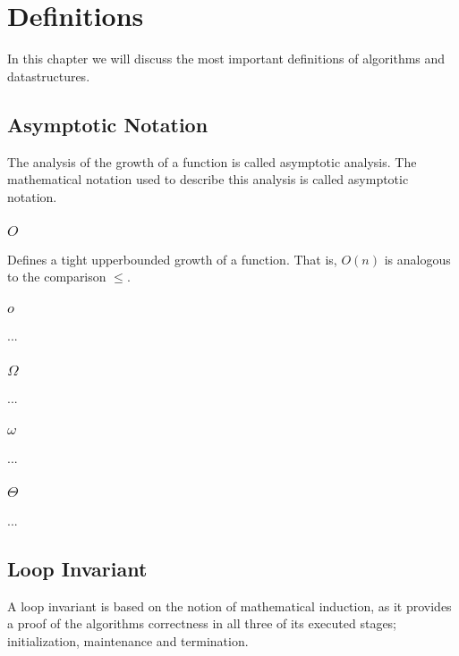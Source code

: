 
\thispagestyle{fancyplain}

\chapter{Definitions}
\label{ch:definitions}
In this chapter we will discuss the most important definitions of algorithms
and datastructures.

\section{Asymptotic Notation}
\label{ch:definitions|sec:asymptotic-notation}
The analysis of the growth of a function is called asymptotic analysis. The
mathematical notation used to describe this analysis is called asymptotic
notation.

\subsection{$O$}
\label{ch:definitions|sec:asymptotic-notation|sub:big-o}
Defines a tight upperbounded growth of a function. That is, $O(n)$ is
analogous to the comparison $\leq$.

\subsection{$o$}
\label{ch:definitions|sec:asymptotic-notation|sub:little-o}
...

\subsection{$\Omega$}
\label{ch:definitions|sec:asymptotic-notation|sub:big-omega}
...

\subsection{$\omega$}
\label{ch:definitions|sec:asymptotic-notation|sub:litte-omega}
...

\subsection{$\Theta$}
\label{ch:definitions|sec:asymptotic-notation|sub:theta}
...

\newpage
\section{Loop Invariant}
\label{ch:definitions|sec:loop-invariant}
A loop invariant is based on the notion of mathematical induction, as it
provides a proof of the algorithms correctness in all three of its executed
stages; initialization, maintenance and termination.

